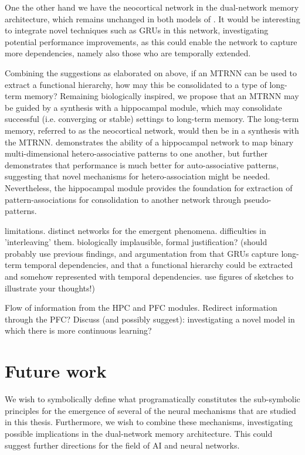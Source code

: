 One the other hand we have the neocortical network in the dual-network memory architecture, which remains unchanged in both models of \cite{Hattori2010, Hattori2014}. It would be interesting to integrate novel techniques such as GRUs in this network, investigating potential performance improvements, as this could enable the network to capture more dependencies, namely also those who are temporally extended.

Combining the suggestions as elaborated on above, if an MTRNN can be used to extract a functional hierarchy, how may this be consolidated to a type of long-term memory? Remaining biologically inspired, we propose that an MTRNN may be guided by a synthesis with a hippocampal module, which may consolidate successful (i.e. converging or stable) settings to long-term memory. The long-term memory, referred to as the neocortical network, would then be in a synthesis with the MTRNN.
\cite{Hattori2014} demonstrates the ability of a hippocampal network to map binary multi-dimensional hetero-associative patterns to one another, but further demonstrates that performance is much better for auto-associative patterns, suggesting that novel mechanisms for hetero-association might be needed. Nevertheless, the hippocampal module provides the foundation for extraction of pattern-associations for consolidation to another network through pseudo-patterns.

limitations. distinct networks for the emergent phenomena. difficulties in 'interleaving' them. biologically implausible, formal justification? (should probably use previous findings, and argumentation from that GRUs capture long-term temporal dependencies, and that a functional hierarchy could be extracted and somehow represented with temporal dependencies. use figures of sketches to illustrate your thoughts!)

Flow of information from the HPC and PFC modules. Redirect information through the PFC? Discuss (and possibly suggest): investigating a novel model in which there is more continuous learning?

\section{Future work}\label{future_work}

We wish to symbolically define what programatically constitutes the sub-symbolic principles for the emergence of several of the neural mechanisms that are studied in this thesis. Furthermore, we wish to combine these mechanisms, investigating possible implications in the dual-network memory architecture. This could suggest further directions for the field of AI and neural networks.

